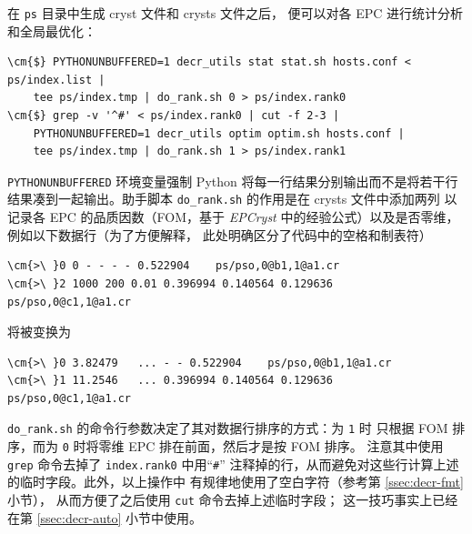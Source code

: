 在 \verb|ps| 目录中生成 cryst 文件和 crysts 文件之后，
便可以对各 EPC 进行统计分析和全局最优化：
\begin{Verbatim}
\cm{$} PYTHONUNBUFFERED=1 decr_utils stat stat.sh hosts.conf < ps/index.list |
	tee ps/index.tmp | do_rank.sh 0 > ps/index.rank0
\cm{$} grep -v '^#' < ps/index.rank0 | cut -f 2-3 |
	PYTHONUNBUFFERED=1 decr_utils optim optim.sh hosts.conf |
	tee ps/index.tmp | do_rank.sh 1 > ps/index.rank1
\end{Verbatim}
\verb|PYTHONUNBUFFERED| 环境变量强制 Python 将每一行结果分别输出而不是将若干行
结果凑到一起输出。助手脚本 \verb|do_rank.sh| 的作用是在 crysts 文件中添加两列
以记录各 EPC 的品质因数（FOM，基于 \emph{EPCryst}\parencite{deng2011}%
中的经验公式）以及是否零维，例如以下数据行（为了方便解释，
此处明确区分了代码中的空格和制表符）
\begin{Verbatim}[showtabs = true, showspaces = true]
\cm{>\ }0 0 - - - - 0.522904	ps/pso,0@b1,1@a1.cr
\cm{>\ }2 1000 200 0.01 0.396994 0.140564 0.129636	ps/pso,0@c1,1@a1.cr
\end{Verbatim}
将被变换为
\begin{Verbatim}[showtabs = true, showspaces = true]
\cm{>\ }0 3.82479	... - - 0.522904	ps/pso,0@b1,1@a1.cr
\cm{>\ }1 11.2546	... 0.396994 0.140564 0.129636	ps/pso,0@c1,1@a1.cr
\end{Verbatim}
\verb|do_rank.sh| 的命令行参数决定了其对数据行排序的方式：为 \verb|1| 时
只根据 FOM 排序，而为 \verb|0| 时将零维 EPC 排在前面，然后才是按 FOM 排序。
注意其中使用 \verb|grep| 命令去掉了 \verb|index.rank0| 中用“\verb|#|”
注释掉的行，从而避免对这些行计算上述的临时字段。此外，以上操作中
有规律地使用了空白字符（参考第 \ref{ssec:decr-fmt} 小节），
从而方便了之后使用 \verb|cut| 命令去掉上述临时字段；
这一技巧事实上已经在第 \ref{ssec:decr-auto} 小节中使用。

